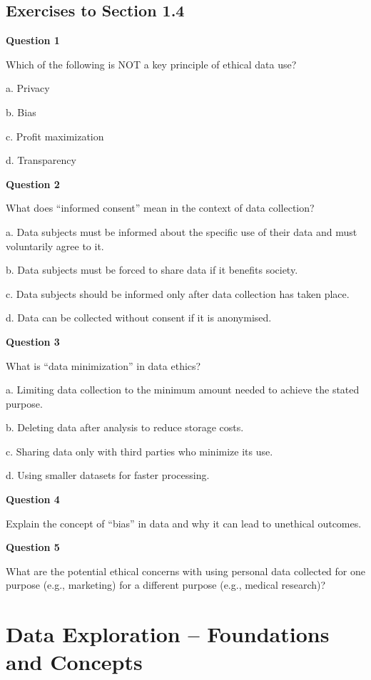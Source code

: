 \documentclass[
]{book}
\begin{document}
\subsection{Exercises to Section 1.4}\label{exercises-to-section-1.4}

\textbf{Question 1}

Which of the following is NOT a key principle of ethical data use?

a. Privacy

b. Bias

c. Profit maximization

d. Transparency

\textbf{Question 2}

What does ``informed consent'' mean in the context of data collection?

a. Data subjects must be informed about the specific use of their data and must voluntarily agree to it.

b. Data subjects must be forced to share data if it benefits society.

c. Data subjects should be informed only after data collection has taken place.

d. Data can be collected without consent if it is anonymised.

\textbf{Question 3}

What is ``data minimization'' in data ethics?

a. Limiting data collection to the minimum amount needed to achieve the stated purpose.

b. Deleting data after analysis to reduce storage costs.

c. Sharing data only with third parties who minimize its use.

d. Using smaller datasets for faster processing.

\textbf{Question 4}

Explain the concept of ``bias'' in data and why it can lead to unethical outcomes.

\textbf{Question 5}

What are the potential ethical concerns with using personal data collected for one purpose (e.g., marketing) for a different purpose (e.g., medical research)?

\newpage

\section{Data Exploration -- Foundations and Concepts}\label{sec1-5}
\end{document}
